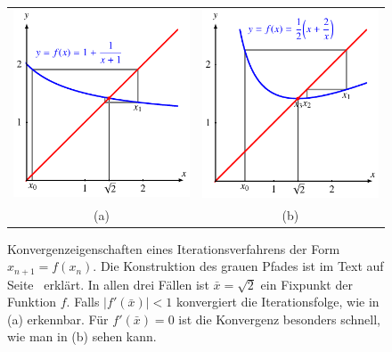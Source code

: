 \begin{figure}
\centering
\begin{tabular}{cc}
\includegraphics{chapters/1a-frames/images/ibkonv.pdf}&
\includegraphics{chapters/1a-frames/images/itkonv.pdf}\\
(a)&(b)
\end{tabular}
\caption{Konvergenzeigenschaften eines Iterationsverfahrens der Form
$x_{n+1}=f(x_n)$.
Die Konstruktion des grauen Pfades ist im Text auf
Seite~\pageref{frame:grauerpfad} erklärt.
In allen drei Fällen ist $\bar{x}=\sqrt{2}$ ein Fixpunkt der Funktion $f$.
Falls $|f'(\bar{x})| < 1$ konvergiert die Iterationsfolge, wie in (a)
erkennbar.
Für $f'(\bar{x})=0$ ist die Konvergenz besonders schnell, wie man in (b)
sehen kann.
\label{frame:iterationsvergleich}}
\end{figure}

